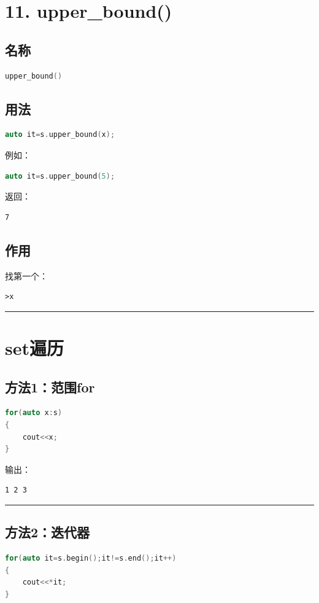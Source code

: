 \documentclass[9pt,twocolumn]{extarticle}
\begin{document}
\section{11. upper\_bound()}

\subsection{名称}
\begin{lstlisting}[language=C++]
upper_bound()
\end{lstlisting}

\subsection{用法}
\begin{lstlisting}[language=C++]
auto it=s.upper_bound(x);
\end{lstlisting}
例如：
\begin{lstlisting}[language=C++]
auto it=s.upper_bound(5);
\end{lstlisting}
返回：
\begin{lstlisting}
7
\end{lstlisting}

\subsection{作用}
找第一个：
\begin{lstlisting}
>x
\end{lstlisting}

\noindent\rule{\linewidth}{0.4pt}

\section{set遍历}

\subsection{方法1：范围for}
\begin{lstlisting}[language=C++]
for(auto x:s)
{
    cout<<x;
}
\end{lstlisting}
输出：
\begin{lstlisting}
1 2 3
\end{lstlisting}

\noindent\rule{\linewidth}{0.4pt}

\subsection{方法2：迭代器}
\begin{lstlisting}[language=C++]
for(auto it=s.begin();it!=s.end();it++)
{
    cout<<*it;
}
\end{lstlisting}
\end{document}
